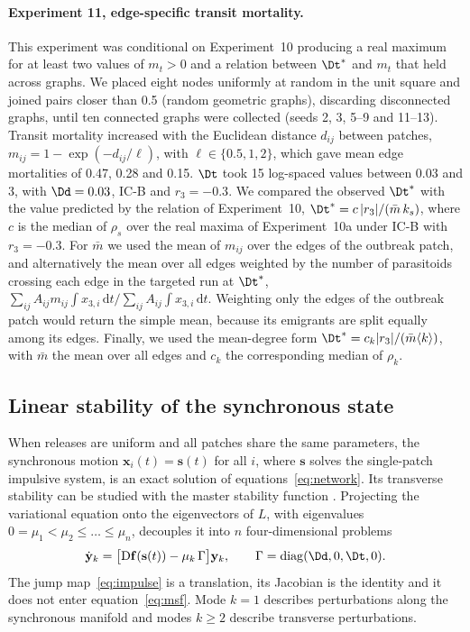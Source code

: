 \paragraph{Experiment 11, edge-specific transit mortality.} This experiment was conditional on Experiment~10 producing a real maximum for at least two values of $m_t > 0$ and a relation between $\Dt^*$ and $m_t$ that held across graphs. We placed eight nodes uniformly at random in the unit square and joined pairs closer than 0.5 (random geometric graphs), discarding disconnected graphs, until ten connected graphs were collected (seeds 2, 3, 5--9 and 11--13). Transit mortality increased with the Euclidean distance $d_{ij}$ between patches, $m_{ij} = 1 - \exp(-d_{ij}/\ell)$, with $\ell \in \{0.5, 1, 2\}$, which gave mean edge mortalities of 0.47, 0.28 and 0.15. $\Dt$ took 15 log-spaced values between 0.03 and 3, with $\Dd = 0.03$, IC-B and $r_3 = -0.3$. We compared the observed $\Dt^*$ with the value predicted by the relation of Experiment~10, $\Dt^* = c\,|r_3|/(\bar m\,k_s)$, where $c$ is the median of $\rho_s$ over the real maxima of Experiment~10a under IC-B with $r_3 = -0.3$. For $\bar m$ we used the mean of $m_{ij}$ over the edges of the outbreak patch, and alternatively the mean over all edges weighted by the number of parasitoids crossing each edge in the targeted run at $\Dt^*$, $\sum_{ij} A_{ij} m_{ij}\int x_{3,i}\,\mathrm{d}t \big/ \sum_{ij} A_{ij}\int x_{3,i}\,\mathrm{d}t$. Weighting only the edges of the outbreak patch would return the simple mean, because its emigrants are split equally among its edges. Finally, we used the mean-degree form $\Dt^* = c_k|r_3|/(\bar m\langle k\rangle)$, with $\bar m$ the mean over all edges and $c_k$ the corresponding median of $\rho_k$.

\subsection{Linear stability of the synchronous state}
\label{sec:stability}

When releases are uniform and all patches share the same parameters, the synchronous motion $\mathbf{x}_i(t) = \mathbf{s}(t)$ for all $i$, where $\mathbf{s}$ solves the single-patch impulsive system, is an exact solution of equations~\eqref{eq:network}. Its transverse stability can be studied with the master stability function \citep{pecora1998,arenas2008}. Projecting the variational equation onto the eigenvectors of $L$, with eigenvalues $0 = \mu_1 < \mu_2 \le \dots \le \mu_n$, decouples it into $n$ four-dimensional problems
\begin{equation}
\dot{\mathbf{y}}_k = \bigl[\mathrm{D}\mathbf{f}(\mathbf{s}(t)) - \mu_k\,\Gamma\bigr]\mathbf{y}_k,\qquad \Gamma = \mathrm{diag}(\Dd, 0, \Dt, 0).
\label{eq:msf}
\end{equation}
The jump map~\eqref{eq:impulse} is a translation, its Jacobian is the identity and it does not enter equation~\eqref{eq:msf}. Mode $k=1$ describes perturbations along the synchronous manifold and modes $k\ge2$ describe transverse perturbations.

